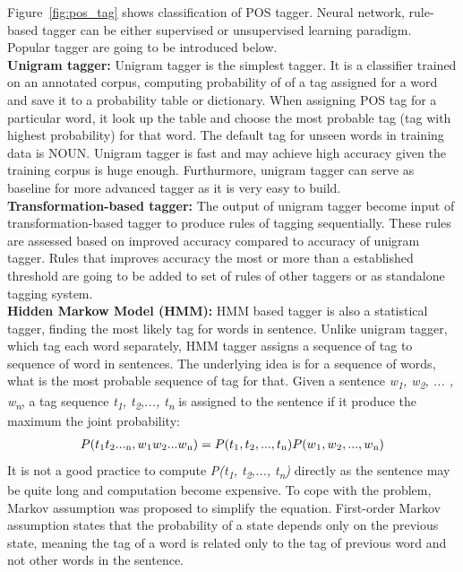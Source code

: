 Figure~\ref{fig:pos_tag} shows classification of POS tagger. Neural network, rule-based tagger can be either supervised or unsupervised learning paradigm. Popular tagger are going to be introduced below.\\
\textbf{Unigram tagger:} Unigram tagger is the simplest tagger. It is a classifier trained on an annotated corpus, computing probability of of a tag assigned for a word and save it to a probability table or dictionary. When assigning POS tag for a particular word, it look up the table and choose the most probable tag (tag with highest probability) for that word. The default tag for unseen words in training data is NOUN. Unigram tagger is fast and may achieve high accuracy given the training corpus is huge enough. Furthurmore, unigram tagger can serve as baseline for more advanced tagger as it is very easy to build. \\
\textbf{Transformation-based tagger:} The output of unigram tagger become input of transformation-based tagger to produce rules of tagging sequentially. These rules are assessed based on improved accuracy compared to accuracy of unigram tagger. Rules that improves accuracy the most or more than a established threshold are going to be added to set of rules of other taggers or as standalone tagging system.\\
\textbf{Hidden Markow Model (HMM):} HMM based tagger is also a statistical tagger, finding the most likely tag for words in sentence. Unlike unigram tagger, which tag each word separately, HMM tagger assigns a sequence of tag to sequence of word in sentences. The underlying idea is for a sequence of words, what is the most probable sequence of tag for that. Given a sentence \textit{w\textsubscript{1}, w\textsubscript{2}, ... , w\textsubscript{n}}, a tag sequence \textit{t\textsubscript{1}, t\textsubscript{2},..., t\textsubscript{n}} is assigned to the sentence if it produce the maximum the joint probability:
\begin{eqnarray*}
P(t\textsubscript{1}t\textsubscript{2}...\textsubscript{n} , w\textsubscript{1}w\textsubscript{2}...w\textsubscript{n}) = P(t\textsubscript{1}, t\textsubscript{2},..., t\textsubscript{n}) P(w\textsubscript{1}, w\textsubscript{2},..., w\textsubscript{n})
\end{eqnarray*}
It is not a good practice to compute \textit{P(t\textsubscript{1}, t\textsubscript{2},..., t\textsubscript{n})} directly as the sentence may be quite long and computation become expensive. To cope with the problem, Markov assumption was proposed to simplify the equation. First-order Markov assumption states that the probability of a state depends only on the previous state, meaning the tag of a word is related only to the tag of previous word and not other words in the sentence.
